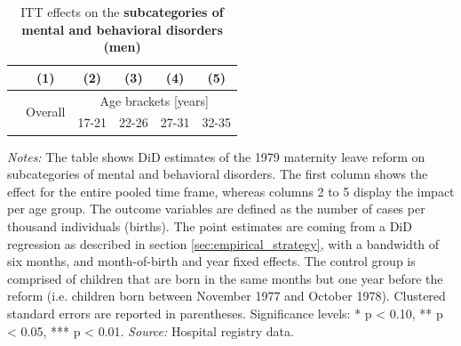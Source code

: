 \documentclass[11pt, a4paper]{article} %
\begin{document}
\newpage
{} 
\vspace*{\fill}
\begin{table}[H] \centering 
	\begin{threeparttable} \centering \caption{ITT effects on the \textbf{subcategories of mental and behavioral disorders (men)}}\label{tab: ITT_across_d5subcategories_per_age_group_men}
		{\def\sym#1{\ifmmode^{#1}\else\(^{#1}\)\fi} 
			\begin{tabular}{l*{5}{c}}
				\toprule 
				&\multicolumn{1}{c}{(1)}&\multicolumn{1}{c}{(2)}&\multicolumn{1}{c}{(3)}&\multicolumn{1}{c}{(4)}&\multicolumn{1}{c}{(5)}\\
				\midrule
				&\multirow{2}{*}{Overall} & \multicolumn{4}{c}{Age brackets [years]} \\ 
				\cmidrule(lr){3-6}
				&&\multicolumn{1}{c}{17-21}&\multicolumn{1}{c}{22-26}&\multicolumn{1}{c}{27-31}&\multicolumn{1}{c}{32-35}\\
				
				\midrule
				
				
				
				\bottomrule 
		\end{tabular}}
	\end{threeparttable} 
	\begin{minipage}{0.9\linewidth}
		\scriptsize \emph{Notes:} The table shows DiD estimates of the 1979 maternity leave reform on subcategories of mental and behavioral disorders. The first column shows the effect for the entire pooled time frame, whereas columns 2 to 5 display the impact per age group. The outcome variables are defined as the number of cases per thousand individuals (births). The point estimates are coming from a DiD regression as described in section \ref{sec:empirical_strategy}, with a bandwidth of six months, and month-of-birth and year fixed effects. The control group is comprised of children that are born in the same months but one year before the reform (i.e. children born between November 1977 and October 1978). Clustered standard errors are reported in parentheses. \newline Significance levels: * p < 0.10, ** p < 0.05, *** p < 0.01. \newline 	\emph{Source:} Hospital registry data.
	\end{minipage}
\end{table} 
\vspace*{\fill}\clearpage 
\restoregeometry
\end{document}
